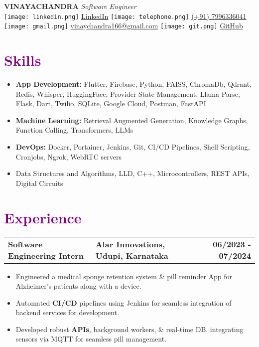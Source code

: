 \documentclass[a4paper,10pt]{article}
\begin{document}
\begin{center}
    \textbf{\hspace{2 cm} \huge VINAYACHANDRA} \hspace{0.5em} \textit{\large Software Engineer} \\
    \vspace{0.4em}
    \texttt{[image: linkedin.png]} \href{https://www.linkedin.com/in/v25/}{LinkedIn} \hspace{1em} 
    \texttt{[image: telephone.png]} \href{tel:+917996336041}{(+91) 7996336041} \hspace{1em}
    \texttt{[image: gmail.png]} \href{mailto:vinaychandra166@gmail.com}{vinaychandra166@gmail.com} \hspace{1em}
    \texttt{[image: git.png]} \href{https://github.com/Vinayy25}{GitHub}
\end{center}

\section*{\textcolor{purple}{Skills}}
\begin{itemize}[leftmargin=*]
    \item \textbf{App Development:} Flutter, Firebase, Python, FAISS, ChromaDb, Qdrant, Redis, Whisper, HuggingFace, Provider State Management, Llama Parse, Flask, Dart, Twilio, SQLite, Google Cloud, Postman, FastAPI
    \item \textbf{Machine Learning:} Retrieval Augmented Generation, Knowledge Graphs, Function Calling, Transformers, LLMs
    \item \textbf{DevOps:} Docker, Portainer, Jenkins, Git, CI/CD Pipelines, Shell Scripting, Cronjobs, Ngrok, WebRTC servers
    \item Data Structures and Algorithms, LLD, C++, Microcontrollers, REST APIs, Digital Circuits
\end{itemize}
\section*{\textcolor{purple}{Experience}}
\begin{tabularx}{\textwidth}{@{}l X r@{}}
    \textbf{Software Engineering Intern} & \hspace{4 em}\textbf{Alar Innovations, Udupi, Karnataka} & \textbf{06/2023 - 07/2024} \\
\end{tabularx}
\begin{itemize}[leftmargin=*]
   \item Engineered a medical sponge retention system \& pill reminder App for Alzheimer’s patients along with a device.
    \item Automated \textbf{CI/CD} pipelines using Jenkins for seamless integration of backend services for development.
    \item Developed robust \textbf{APIs}, background workers, \& real-time DB, integrating sensors via MQTT for seamless pill management.
\end{itemize}
\end{document}
